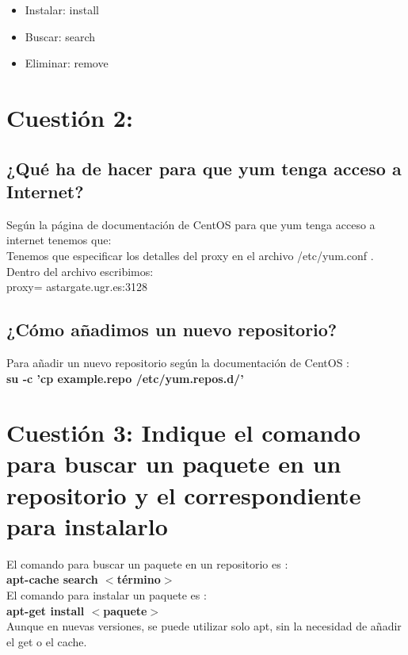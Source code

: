 \begin{itemize}
	\item Instalar: install
	\item Buscar: search
	\item Eliminar: remove
\end{itemize}


\section{Cuestión 2:}
\subsection{ ¿Qué ha de hacer para que yum tenga acceso a Internet?}
Según la página de documentación de CentOS \cite{yum-proxy} para que yum tenga acceso a internet tenemos que:\\
Tenemos que especificar los detalles del proxy en el archivo /etc/yum.conf .
Dentro del archivo escribimos:\\
proxy= astargate.ugr.es:3128\\
\subsection{¿Cómo añadimos un nuevo repositorio?}
Para añadir un nuevo repositorio según la documentación de CentOS \cite{anadirrepositorio}:\\
\textbf{su -c 'cp example.repo /etc/yum.repos.d/'}


\section{Cuestión 3: Indique el comando para buscar un paquete en un repositorio y el correspondiente para instalarlo}
El comando para buscar un paquete en un repositorio es \cite{apt-search}:\\
\textbf{apt-cache search $<$término$>$}\\
El comando para instalar un paquete es \cite{apt-search}:\\
\textbf{apt-get install $<$paquete$>$}\\
Aunque en nuevas versiones, se puede utilizar solo apt, sin la necesidad de añadir el get o el cache.

